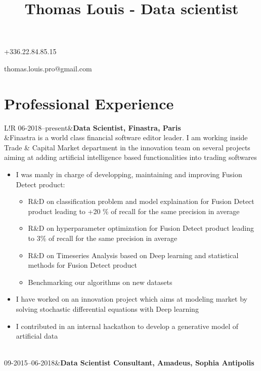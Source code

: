 \documentclass[6pt]{article}
\title{\vspace{-3ex}\bfseries\Huge Thomas Louis - Data scientist\vspace{-3ex}}
\date{}
\newcommand\VRule{\color{lightgray}\vrule width 0.5pt}
\begin{document}
\begingroup
\let\center\flushleft
\let\endcenter\endflushleft
\maketitle
\endgroup
\begin{minipage}[ht]{0.48\textwidth}
+336.22.84.85.15
\end{minipage}
\begin{minipage}[ht]{0.48\textwidth}
thomas.louis.pro@gmail.com
\end{minipage}
\section*{Professional Experience}
\begin{tabular}{L!{\VRule}R}
06-2018--present&\textbf{Data Scientist, Finastra, Paris}\\
	&Finastra is a world class financial software editor leader. I am working inside Trade \& Capital Market department in the innovation team on several projects aiming at adding artificial intelligence based functionalities into trading softwares
	\begin{itemize}
		\item I was manly in charge of developping, maintaining and improving Fusion Detect product: 
			\begin{itemize}
		              \item R\&D on classification problem and model explaination for Fusion Detect product leading to +20 \% of recall for the same precision in average
		              \item R\&D on hyperparameter optimization for Fusion Detect product leading to 3\% of recall for the same precision in average 
		              \item R\&D on Timeseries Analysis based on Deep learning and statistical methods for Fusion Detect product
		              \item Benchmarking our algorithms on new datasets 
			\end{itemize}
		\item I have worked on an innovation project which aims at modeling market by solving stochastic differential equations with Deep learning
		\item I contributed in an internal hackathon to develop a generative model of artificial data
	\end{itemize}
\\[5pt]
09-2015--06-2018&\textbf{Data Scientist Consultant, Amadeus, Sophia Antipolis}\\

\end{tabular}
\end{document}
